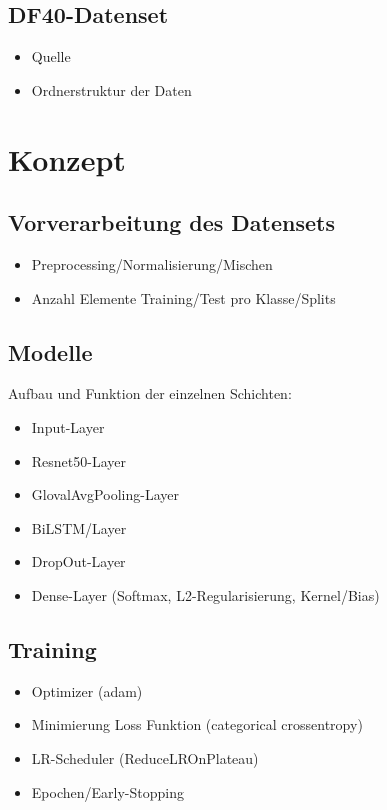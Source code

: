 \documentclass{article}
\begin{document}
    \subsection{DF40-Datenset}
    \begin{itemize}
        \item Quelle~\cite{yan2024df40}
        \item Ordnerstruktur der Daten
    \end{itemize}

    \newpage
    \section{Konzept}
    \subsection{Vorverarbeitung des Datensets}
    \begin{itemize}
        \item Preprocessing/Normalisierung/Mischen
        \item Anzahl Elemente Training/Test pro Klasse/Splits
    \end{itemize}
    \subsection{Modelle}
    Aufbau und Funktion der einzelnen Schichten:
    \begin{itemize}
        \item Input-Layer
        \item Resnet50-Layer
        \item GlovalAvgPooling-Layer
        \item BiLSTM/Layer
        \item DropOut-Layer
        \item Dense-Layer (Softmax, L2-Regularisierung, Kernel/Bias)
    \end{itemize}
    \subsection{Training}
    \begin{itemize}
        \item Optimizer (adam)
        \item Minimierung Loss Funktion (categorical crossentropy)
        \item LR-Scheduler (ReduceLROnPlateau)
        \item Epochen/Early-Stopping
    \end{itemize}
\end{document}
